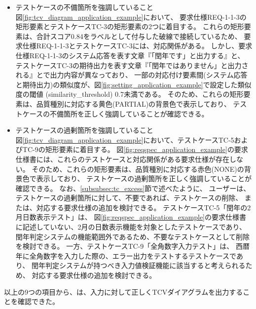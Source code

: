 \begin{itemize}
    \item テストケースの不備箇所を強調していること\\
    図\ref{fig:tcv_diagram_application_example}において、
    要求仕様REQ-1-1-3の矩形要素とテストケースTC-3の矩形要素の2つに着目する。
    これらの矩形要素は、合計スコア0.84をラベルとして付与した破線で接続しているため、
    要求仕様REQ-1-1-3とテストケースTC-3には、対応関係がある。                                                         
    しかし、要求仕様REQ-1-1-3のシステム応答を表す文章『「閏年です」と出力する』と、                       
    テストケースTC-3の期待出力を表す文章『「閏年ではありません」と出力される』とで出力内容が異なっており、
    一部の対応付け要素間(システム応答と期待出力)の類似度が、図\ref{fig:setting_application_example}で設定した類似度の閾値 (similarity\_threshold) 0.7未満である。                                                                                          
    そのため、これらの矩形要素は、品質種別に対応する黄色(PARTIAL)の背景色で表示しており、         
    テストケースの不備箇所を正しく強調していることが確認できる。

    \item テストケースの過剰箇所を強調していること\\
    図\ref{fig:tcv_diagram_application_example}において、テストケースTC-5およびTC-9の矩形要素に着目する。                                          
    図\ref{fig:reqspec_application_example}の要求仕様書には、これらのテストケースと対応関係がある要求仕様が存在しない。                                   
    そのため、これらの矩形要素は、品質種別に対応する赤色(NONE)の背景色で表示しており、                                                
    テストケースの過剰箇所を正しく強調していることが確認できる。
    なお、\ref{subsubsec:tc_excess}節で述べたように、                                                                           
    ユーザーは、テストケースの過剰箇所に対して、不要であれば、テストケースの削除、                                                                    
    または、対応する要求仕様の追加を検討できる。                                                                                      
    テストケースTC-5「閏年の2月日数表示テスト」は、
    図\ref{fig:reqspec_application_example}の要求仕様書に記述していない、2月の日数表示機能を対象としたテストケースであり、
    閏年判定システムの機能範囲外であるため、不要なテストケースとして削除を検討できる。
    一方、テストケースTC-9「全角数字入力テスト」は、
    西暦年に全角数字を入力した際の、エラー出力をテストするテストケースであり、
    閏年判定システムが持つべき入力値検証機能に該当すると考えられるため、
    対応する要求仕様の追加を検討できる。
\end{itemize}

以上の9つの項目から、\tool{}は、入力に対して正しくTCVダイアグラムを出力することを確認できた。